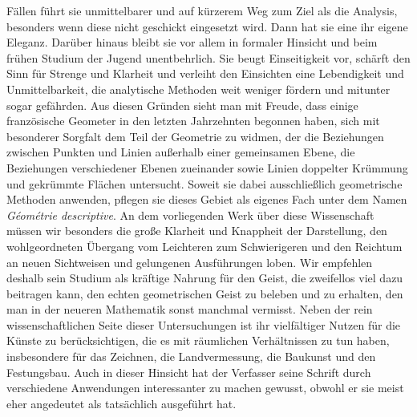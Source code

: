 %
Fällen führt sie unmittelbarer und auf kürzerem Weg zum Ziel als die Analysis, besonders wenn diese nicht geschickt eingesetzt wird. Dann hat sie eine ihr eigene Eleganz. Darüber hinaus bleibt sie vor allem in formaler Hinsicht und beim frühen Studium der Jugend unentbehrlich. Sie beugt Einseitigkeit vor, schärft den Sinn für Strenge und Klarheit und verleiht den Einsichten eine Lebendigkeit und Unmittelbarkeit, die analytische Methoden weit weniger fördern und mitunter sogar gefährden. Aus diesen Gründen sieht man mit Freude, dass einige französische Geometer in den letzten Jahrzehnten begonnen haben, sich mit besonderer Sorgfalt dem Teil der Geometrie zu widmen, der die Beziehungen zwischen Punkten und Linien außerhalb einer gemeinsamen Ebene, die Beziehungen verschiedener Ebenen zueinander sowie Linien doppelter Krümmung und gekrümmte Flächen untersucht. Soweit sie dabei ausschließlich geometrische Methoden anwenden, pflegen sie dieses Gebiet als eigenes Fach unter dem Namen \textit{Géométrie descriptive}. An dem vorliegenden Werk über diese Wissenschaft müssen wir besonders die große Klarheit und Knappheit der Darstellung, den wohlgeordneten Übergang vom Leichteren zum Schwierigeren und den Reichtum an neuen Sichtweisen und gelungenen Ausführungen loben. Wir empfehlen deshalb sein Studium als kräftige Nahrung für den Geist, die zweifellos viel dazu beitragen kann, den echten geometrischen Geist zu beleben und zu erhalten, den man in der neueren Mathematik sonst manchmal vermisst. Neben der rein wissenschaftlichen Seite dieser Untersuchungen ist ihr vielfältiger Nutzen für die Künste zu berücksichtigen, die es mit räumlichen Verhältnissen zu tun haben, insbesondere für das Zeichnen, die Landvermessung, die Baukunst und den Festungsbau. Auch in dieser Hinsicht hat der Verfasser seine Schrift durch verschiedene Anwendungen interessanter zu machen gewusst, obwohl er sie meist eher angedeutet als tatsächlich ausgeführt hat.
